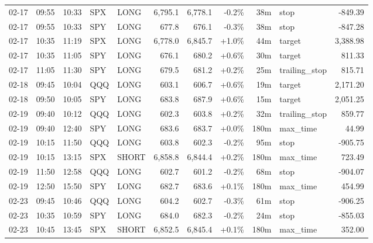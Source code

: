 \documentclass[11pt,a4paper,twoside]{article}
\begin{document}
\begin{center}
\begin{longtable}{>{\color{txtmain}}l l l l l r r r r >{\color{txtmain}}l r}
02-17 & 09:55 & 10:33 & SPX & LONG & 6,795.1 & 6,778.1 & \textcolor{lossred}{-0.2\%} & 38m & stop & \textcolor{lossred}{-849.39} \\
02-17 & 09:55 & 10:33 & SPY & LONG & 677.8 & 676.1 & \textcolor{lossred}{-0.3\%} & 38m & stop & \textcolor{lossred}{-847.28} \\
02-17 & 10:35 & 11:19 & SPX & LONG & 6,778.0 & 6,845.7 & \textcolor{wingreen}{+1.0\%} & 44m & target & \textcolor{wingreen}{3,388.98} \\
02-17 & 10:35 & 11:05 & SPY & LONG & 676.1 & 680.2 & \textcolor{wingreen}{+0.6\%} & 30m & target & \textcolor{wingreen}{811.33} \\
02-17 & 11:05 & 11:30 & SPY & LONG & 679.5 & 681.2 & \textcolor{wingreen}{+0.2\%} & 25m & trailing\_stop & \textcolor{wingreen}{815.71} \\
02-18 & 09:45 & 10:04 & QQQ & LONG & 603.1 & 606.7 & \textcolor{wingreen}{+0.6\%} & 19m & target & \textcolor{wingreen}{2,171.20} \\
02-18 & 09:50 & 10:05 & SPY & LONG & 683.8 & 687.9 & \textcolor{wingreen}{+0.6\%} & 15m & target & \textcolor{wingreen}{2,051.25} \\
02-19 & 09:40 & 10:12 & QQQ & LONG & 602.3 & 603.8 & \textcolor{wingreen}{+0.2\%} & 32m & trailing\_stop & \textcolor{wingreen}{859.77} \\
02-19 & 09:40 & 12:40 & SPY & LONG & 683.6 & 683.7 & \textcolor{wingreen}{+0.0\%} & 180m & max\_time & \textcolor{wingreen}{44.99} \\
02-19 & 10:15 & 11:50 & QQQ & LONG & 603.8 & 602.3 & \textcolor{lossred}{-0.2\%} & 95m & stop & \textcolor{lossred}{-905.75} \\
02-19 & 10:15 & 13:15 & SPX & SHORT & 6,858.8 & 6,844.4 & \textcolor{wingreen}{+0.2\%} & 180m & max\_time & \textcolor{wingreen}{723.49} \\
02-19 & 11:50 & 12:58 & QQQ & LONG & 602.7 & 601.2 & \textcolor{lossred}{-0.2\%} & 68m & stop & \textcolor{lossred}{-904.07} \\
02-19 & 12:50 & 15:50 & SPY & LONG & 682.7 & 683.6 & \textcolor{wingreen}{+0.1\%} & 180m & max\_time & \textcolor{wingreen}{454.99} \\
02-23 & 09:45 & 10:46 & QQQ & LONG & 604.2 & 602.7 & \textcolor{lossred}{-0.3\%} & 61m & stop & \textcolor{lossred}{-906.25} \\
02-23 & 10:35 & 10:59 & SPY & LONG & 684.0 & 682.3 & \textcolor{lossred}{-0.2\%} & 24m & stop & \textcolor{lossred}{-855.03} \\
02-23 & 10:45 & 13:45 & SPX & SHORT & 6,852.5 & 6,845.4 & \textcolor{wingreen}{+0.1\%} & 180m & max\_time & \textcolor{wingreen}{352.00} \\

\end{longtable}
\end{center}
\end{document}
